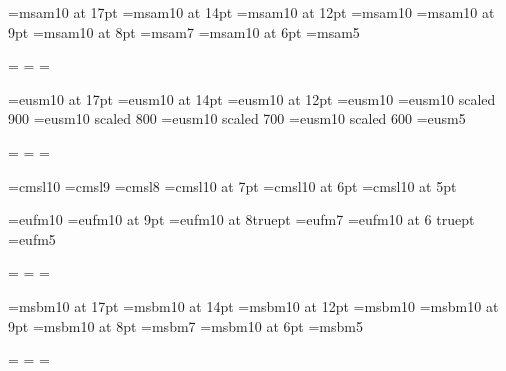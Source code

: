 %

\font\seventeenmsa=msam10 at 17pt   
\font\fourteenmsa=msam10 at 14pt
\font\twelvemsa=msam10 at 12pt
\font\tenmsa=msam10
\font\ninemsa=msam10 at 9pt
\font\eightmsa=msam10 at 8pt
\font\sevenmsa=msam7
\font\sixmsa=msam10 at 6pt
\font\fivemsa=msam5

\newfam\msafam
\textfont\msafam=\tenmsa
\scriptfont\msafam=\sevenmsa
\scriptscriptfont\msafam=\fivemsa


\font\seventeenscaln=eusm10 at 17pt
\font\fourteenscaln=eusm10 at 14pt
\font\twelvescaln=eusm10 at 12pt
\font\tenscaln=eusm10
\font\ninescaln=eusm10 scaled 900
\font\eightscaln=eusm10 scaled 800
\font\sevenscaln=eusm10 scaled 700
\font\sixscaln=eusm10 scaled 600
\font\fivescaln=eusm5

\newfam\scalnfam
\textfont\scalnfam=\tenscaln
\scriptfont\scalnfam=\sevenscaln
\scriptscriptfont\scalnfam=\fivescaln

\def\scal{\fam\scalnfam\tenscaln}

% 
\font\tensl=cmsl10
\font\ninesl=cmsl9                 
\font\eightsl=cmsl8
\font\sevensl=cmsl10 at 7pt
\font\sixsl=cmsl10 at 6pt
\font\fivesl=cmsl10 at 5pt



\font\tengot=eufm10                       
\font\ninegot=eufm10 at 9pt
\font\eightgot=eufm10 at 8truept
\font\sevengot=eufm7
\font\sixgot=eufm10 at 6 truept
\font\fivegot=eufm5

\newfam\gotfam
\textfont\gotfam=\tengot
\scriptfont\gotfam=\sevengot
\scriptscriptfont\gotfam=\fivegot
\def\got{\fam\gotfam\tengot}


\font\seventeenbb=msbm10 at 17pt     
\font\fourteenbb=msbm10 at 14pt
\font\twelvebb=msbm10 at 12pt
\font\tenbb=msbm10                   
\font\ninebb=msbm10 at 9pt
\font\eightbb=msbm10 at 8pt
\font\sevenbb=msbm7
\font\sixbb=msbm10 at 6pt
\font\fivebb=msbm5

\newfam\bbfam
\textfont\bbfam=\tenbb
\scriptfont\bbfam=\sevenbb
\scriptscriptfont\bbfam=\fivebb

